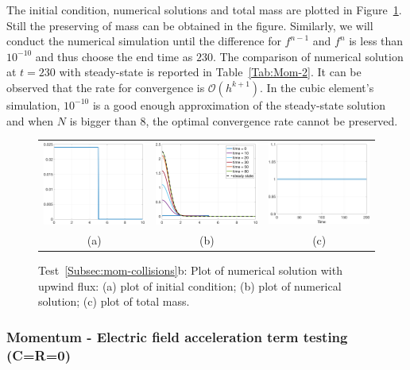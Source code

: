 \documentclass[preprint,11pt]{elsarticle}
\begin{document}
The initial condition, numerical solutions and total mass are plotted in Figure~\ref{Fig:Mom}. Still the preserving of mass can be obtained in the figure.
Similarly, we will conduct the numerical simulation until the difference for $f^{n-1}$ and $f^n$ is less than $10^{-10}$ and thus choose the end time as $230$. The comparison of numerical solution at $t = 230$ with steady-state is reported in Table~\ref{Tab:Mom-2}. It can be observed that the rate for convergence is $\mathcal{O}(h^{k+1})$. In the cubic element's simulation, $10^{-10}$ is a good enough approximation of the steady-state solution and when $N$ is bigger than 8, the optimal convergence rate cannot be preserved.
%
\begin{figure}[H]
\centering
\begin{tabular}{ccc}
\includegraphics[width=.3\textwidth]{./NumFig/Ini-Mom-2-zoom}
&\includegraphics[width=.3\textwidth]{./NumFig/Ini-Mom-2}
&\includegraphics[width=.3\textwidth]{./NumFig/Ini-Mom-2-Conv.png}\\
(a) & (b) & (c)
\end{tabular}
\caption{Test~\ref{Subsec:mom-collisions}b: Plot of numerical solution with upwind flux: (a) plot of initial condition; (b) plot of numerical solution; (c) plot of total mass.}\label{Fig:Mom}
\end{figure}


\subsubsection{Momentum - Electric field acceleration term testing (C=R=0)}
\end{document}
